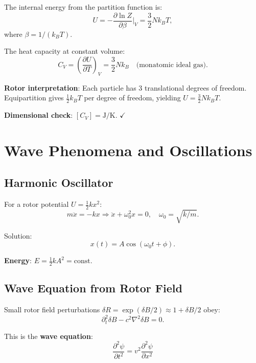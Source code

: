 \documentclass[12pt,a4paper]{article}
\theoremstyle{definition}
\theoremstyle{remark}
\begin{document}
The internal energy from the partition function is:
\begin{equation}
U = -\frac{\partial \ln Z}{\partial \beta}\bigg|_V = \frac{3}{2}Nk_B T,
\end{equation}
where $\beta = 1/(k_B T)$.

The heat capacity at constant volume:
\begin{equation}
C_V = \left(\frac{\partial U}{\partial T}\right)_V = \frac{3}{2}Nk_B \quad \text{(monatomic ideal gas)}.
\end{equation}

\textbf{Rotor interpretation}: Each particle has 3 translational degrees of freedom. Equipartition gives $\frac{1}{2}k_B T$ per degree of freedom, yielding $U = \frac{3}{2}Nk_B T$.

\textbf{Dimensional check}: $[C_V] = \text{J/K}$. $\checkmark$

\section{Wave Phenomena and Oscillations}

\subsection{Harmonic Oscillator}

For a rotor potential $U = \frac{1}{2}kx^2$:
\begin{equation}
m\ddot{x} = -kx \Rightarrow \ddot{x} + \omega_0^2 x = 0, \quad \omega_0 = \sqrt{k/m}.
\end{equation}

Solution:
\begin{equation}
x(t) = A\cos(\omega_0 t + \phi).
\end{equation}

\textbf{Energy}: $E = \frac{1}{2}kA^2 = \text{const}$.

\subsection{Wave Equation from Rotor Field}

Small rotor field perturbations $\delta R = \exp(\delta B/2) \approx 1 + \delta B/2$ obey:
\begin{equation}
\partial_t^2 \delta B - c^2 \nabla^2 \delta B = 0.
\end{equation}

This is the \textbf{wave equation}:
\begin{equation}
\boxed{\frac{\partial^2 \psi}{\partial t^2} = v^2 \frac{\partial^2 \psi}{\partial x^2}}
\end{equation}
\end{document}
